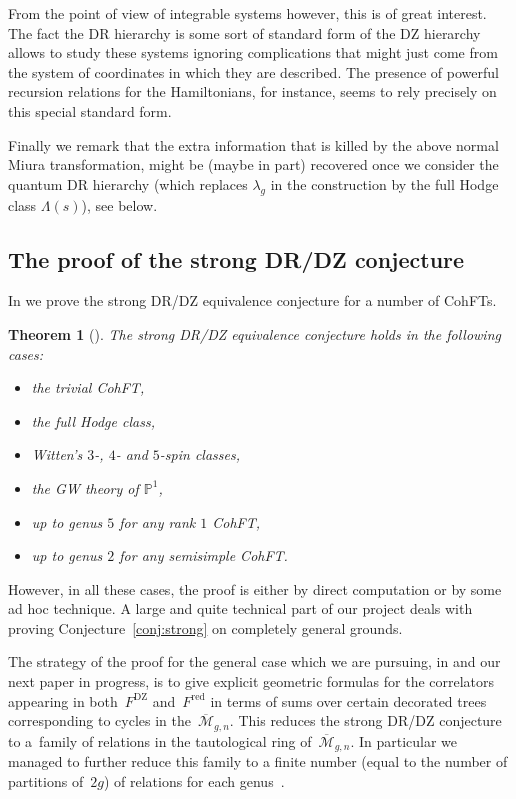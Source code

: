 \documentclass[pdftex]{sigma}
\numberwithin{equation}{section}
\newtheorem{Theorem}{Theorem}[section]
\newcommand{\mbP}{\mathbb P}
\newcommand{\oM}{\overline{\mathcal M}}
\newcommand{\<}{\left<}
\renewcommand{\>}{\right>}
\newcommand{\DZ}{\mathrm{DZ}}
\begin{document}
From the point of view of integrable systems however, this is of great interest. The fact the DR hierarchy is some sort of standard form of the DZ hierarchy allows to study these systems ignoring complications that might just come from the system of coordinates in which they are described. The presence of powerful recursion relations for the Hamiltonians, for instance, seems to rely precisely on this special standard form.

Finally we remark that the extra information that is killed by the above normal Miura transformation, might be (maybe in part) recovered once we consider the quantum DR hierarchy (which replaces $\lambda_g$ in the construction by the full Hodge class $\Lambda(s)$), see below.

\subsection{The proof of the strong DR/DZ conjecture} In \cite{BDGR16a} we prove the strong DR/DZ equivalence conjecture for a number of CohFTs.

\begin{Theorem}[\cite{BDGR16a,BDGR17}]
The strong DR/DZ equivalence conjecture holds in the following cases:
\begin{itemize}\itemsep=0pt
\item the trivial CohFT,
\item the full Hodge class,
\item Witten's $3$-, $4$- and $5$-spin classes,
\item the GW theory of $\mbP^1$,
\item up to genus $5$ for any rank $1$ CohFT,
\item up to genus $2$ for any semisimple CohFT.
\end{itemize}
\end{Theorem}

However, in all these cases, the proof is either by direct computation or by some ad hoc technique. A large and quite technical part of our project deals with proving Conjecture~\ref{conj:strong} on completely general grounds.

The strategy of the proof for the general case which we are pursuing, in \cite{BDGR16b} and our next paper in progress, is to give explicit geometric formulas for the correlators appearing in both~$F^\DZ$ and~$F^\mathrm{red}$ in terms of sums over certain decorated trees corresponding to cycles in the~$\oM_{g,n}$. This reduces the strong DR/DZ conjecture to a~family of relations in the tautological ring of~$\oM_{g,n}$. In particular we managed to further reduce this family to a f\/inite number (equal to the number of partitions of~$2g$) of relations for each genus~\cite{BDGR17}.
\end{document}
